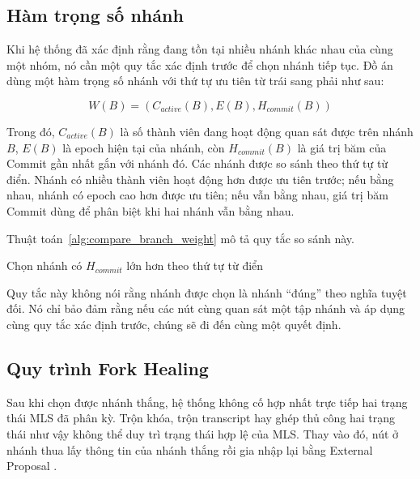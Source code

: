 \documentclass[../DoAn.tex]{subfiles}
\begin{document}
\subsection{Hàm trọng số nhánh}

Khi hệ thống đã xác định rằng đang tồn tại nhiều nhánh khác nhau của cùng một nhóm, nó cần một quy tắc xác định trước để chọn nhánh tiếp tục. Đồ án dùng một hàm trọng số nhánh với thứ tự ưu tiên từ trái sang phải như sau:

\begin{equation}
\label{eq:branch_weight}
W(B) = \left(C_{active}(B), E(B), H_{commit}(B)\right)
\end{equation}

Trong đó, $C_{active}(B)$ là số thành viên đang hoạt động quan sát được trên nhánh $B$, $E(B)$ là epoch hiện tại của nhánh, còn $H_{commit}(B)$ là giá trị băm của Commit gần nhất gắn với nhánh đó. Các nhánh được so sánh theo thứ tự từ điển. Nhánh có nhiều thành viên hoạt động hơn được ưu tiên trước; nếu bằng nhau, nhánh có epoch cao hơn được ưu tiên; nếu vẫn bằng nhau, giá trị băm Commit dùng để phân biệt khi hai nhánh vẫn bằng nhau.

Thuật toán~\ref{alg:compare_branch_weight} mô tả quy tắc so sánh này.

\begin{algorithm}[htbp]
\SetAlgoLined
{}
\BlankLine
{}
Chọn nhánh có $H_{commit}$ lớn hơn theo thứ tự từ điển\;
\caption{So sánh trọng số nhánh ($CompareBranchWeight$)}
\label{alg:compare_branch_weight}
\end{algorithm}

Quy tắc này không nói rằng nhánh được chọn là nhánh ``đúng'' theo nghĩa tuyệt đối. Nó chỉ bảo đảm rằng nếu các nút cùng quan sát một tập nhánh và áp dụng cùng quy tắc xác định trước, chúng sẽ đi đến cùng một quyết định.

\subsection{Quy trình Fork Healing}

Sau khi chọn được nhánh thắng, hệ thống không cố hợp nhất trực tiếp hai trạng thái MLS đã phân kỳ. Trộn khóa, trộn transcript hay ghép thủ công hai trạng thái như vậy không thể duy trì trạng thái hợp lệ của MLS. Thay vào đó, nút ở nhánh thua lấy thông tin của nhánh thắng rồi gia nhập lại bằng External Proposal \cite{rfc9420}.
\end{document}
